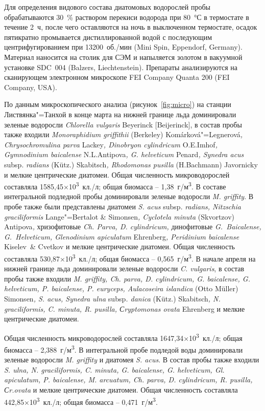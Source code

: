 \documentclass[a4paper,12pt,openany,final]{extreport}
\begin{document}
Для определения видового состава диатомовых водорослей пробы обрабатываются 30~\% раствором перекиси водорода при 80~°С в термостате в течение 2~ч, после чего оставляются на ночь в выключенном термостате, осадок пятикратно промывается дистиллированной водой с последующим центрифугированием при 13200~об./мин (Mini Spin, Eppendorf, Germany). Материал наносится на столик для СЭМ и напыляется золотом в вакуумной установке SDC~004 (Balzers, Liechtenstein). Препараты анализируются на сканирующем электронном микроскопе FEI Company Quanta 200 (FEI Company, USA).


По данным микроскопического анализа (рисунок~\ref{fig:micro}) на станции Листвянка"=Танхой в конце марта на нижней границе льда доминировали зеленые водоросли \emph{Chlorella vulgaris} Beyerinck {[}Beijerinck{]}, в состав пробы также входили \emph{Monoraphidium griffithii} (Berkeley) Komárková"=Legnerová\emph{, Chrysochromulina parva} Lackey\emph{, Dinobryon cylindricum} O.E.Imhof\emph{, Gymnodinium baicalense} N.L.Antipova\emph{, G. helveticum} Penard\emph{, Synedra acus} subsp.  \emph{radians} (Kütz.) Skabitsch\emph{, Rhodomonas pusilla} (H.Bachmann) Javornicky и мелкие центрические диатомеи. Общая численность микроводорослей составляла 1585,45×10\textsuperscript{3}~кл./л; общая биомасса -- 1,38~г/м\textsuperscript{3}. В составе интегральной подледной пробы доминировали зеленые водоросли \emph{M. griffity}. В пробе также были представлены диатомеи \emph{S. acus} subsp. \emph{radians, Nitzschia graciliformis} Lange"=Bertalot \& Simonsen\emph{, Cyclotela minuta} (Skvortzov) Antipova\emph{,} хризофитовые \emph{Ch. Parva, D.  cylindricum,} динофитовые \emph{G.~Baicalense, G.~Helveticum, Glenodinium apiculatum} Ehrenberg\emph{, Peridinium baicalense} Kiselev~\& Cvetkov и мелкие центрические диатомеи. Общая численность составляла 530,87×10\textsuperscript{3}~кл./л; общая биомасса -- 0,565~г/м\textsuperscript{3}. В начале апреля на нижней границе льда доминировали зеленые водоросли \emph{C. vulgaris}, в состав пробы также входили \emph{M. griffity, Ch. parva, D. cylindricum, G. baicalense, G.  helveticum, P. baicalense, P. euryceps, Aulacoseira islandica} (Otto Müller) Simonsen\emph{, S. acus, Synedra ulna} subsp\emph{. danica} (Kütz.) Skabitsch\emph{, N. graciliformis, C. minuta, R. pusilla, Сryptomonas ovata} Ehrenberg и мелкие центрические диатомеи.


Общая численность микроводорослей составляла 1647,34×10\textsuperscript{3}~кл./л; общая биомасса -- 2,388~г/м\textsuperscript{3}. В интегральной пробе подледой воды доминировали зеленые водоросли \emph{M. griffity} и диатомея \emph{S.  acus}. В состав пробы также входили \emph{S. ulna, N. graciliformis, C.  minuta, G. baicalense, G. helveticum, Gl. apiculatum, P. baicalense, M.  arcuatum, Ch. parva, D. cylindricum, R. pusilla, Сr.ovata} и мелкие центрические диатомеи. Общая численность составляла 442,85×10\textsuperscript{3}~кл./л; общая биомасса -- 0,471~г/м\textsuperscript{3}.
\end{document}
